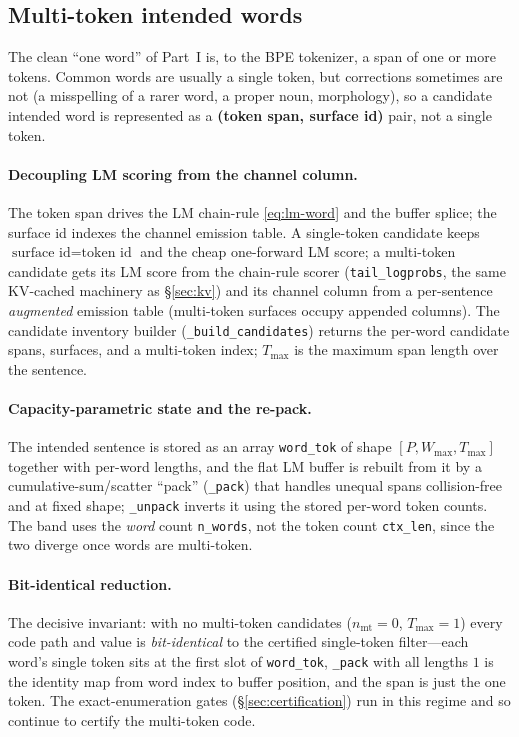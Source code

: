 \documentclass[11pt]{article}
\providecommand{\code}[1]{\texttt{#1}}
\begin{document}
\subsection{Multi-token intended words}
\label{sec:multitoken}

The clean ``one word'' of Part~I is, to the BPE tokenizer, a span of one or more tokens. Common words are usually a single token, but corrections sometimes are not (a misspelling of a rarer word, a proper noun, morphology), so a candidate intended word is represented as a \textbf{(token span, surface id)} pair, not a single token.

\paragraph{Decoupling LM scoring from the channel column.} The token span drives the LM chain-rule \eqref{eq:lm-word} and the buffer splice; the surface id indexes the channel emission table. A single-token candidate keeps $\text{surface id} = \text{token id}$ and the cheap one-forward LM score; a multi-token candidate gets its LM score from the chain-rule scorer (\code{tail\_logprobs}, the same KV-cached machinery as \S\ref{sec:kv}) and its channel column from a per-sentence \emph{augmented} emission table (multi-token surfaces occupy appended columns). The candidate inventory builder (\code{\_build\_candidates}) returns the per-word candidate spans, surfaces, and a multi-token index; $T_{\max}$ is the maximum span length over the sentence.

\paragraph{Capacity-parametric state and the re-pack.} The intended sentence is stored as an array \code{word\_tok} of shape $[P, W_{\max}, T_{\max}]$ together with per-word lengths, and the flat LM buffer is rebuilt from it by a cumulative-sum/scatter ``pack'' (\code{\_pack}) that handles unequal spans collision-free and at fixed shape; \code{\_unpack} inverts it using the stored per-word token counts. The band uses the \emph{word} count \code{n\_words}, not the token count \code{ctx\_len}, since the two diverge once words are multi-token.

\paragraph{Bit-identical reduction.} The decisive invariant: with no multi-token candidates ($n_{\mathrm{mt}} = 0$, $T_{\max}=1$) every code path and value is \emph{bit-identical} to the certified single-token filter---each word's single token sits at the first slot of \code{word\_tok}, \code{\_pack} with all lengths $1$ is the identity map from word index to buffer position, and the span is just the one token. The exact-enumeration gates (\S\ref{sec:certification}) run in this regime and so continue to certify the multi-token code.
\end{document}

